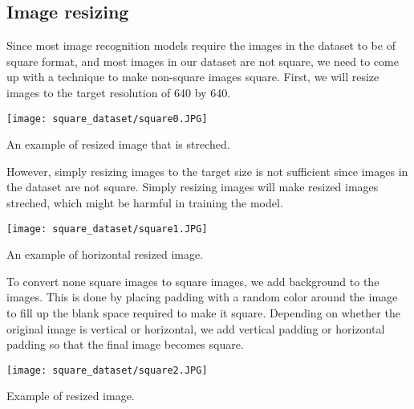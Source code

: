 

\newpage
\subsection{Image resizing}
Since most image recognition models require the images in the dataset to be of square format, and most images in our dataset are not square, we need to come up with a technique to make non-square images square. First, we will resize images to the target resolution of 640 by 640.
\begin{marginfigure} %
	\texttt{[image: square\_dataset/square0.JPG]}
	\caption{An example of resized image that is streched.}
\end{marginfigure}

However, simply resizing images to the target size is not sufficient since images in the dataset are not square. Simply resizing images will make resized images streched, which might be harmful in training the model.

\begin{marginfigure} %
	\texttt{[image: square\_dataset/square1.JPG]}
	\caption{An example of horizontal resized image.}
\end{marginfigure}

To convert none square images to square images, we add background to the images. This is done by placing padding with a random color around the image to fill up the blank space required to make it square.
Depending on whether the original image is vertical or horizontal, we add vertical padding or horizontal padding so that the final image becomes square.


\begin{marginfigure} %
	\texttt{[image: square\_dataset/square2.JPG]}
	\caption{Example of resized image.}
\end{marginfigure}

